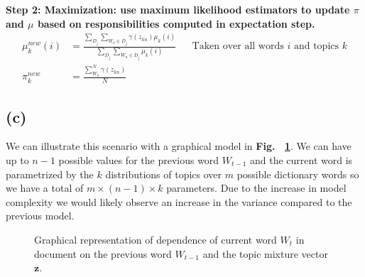 \documentclass[11pt]{amsart}
\newcommand{\vek}[1]{\mathbf{#1}}
\begin{document}
{\bf Step 2: Maximization: use maximum likelihood estimators to update $\pi$ and $\mu$ based on responsibilities computed in expectation step.}\\


\begin{equation}
\begin{aligned}
\mu_{k}^{new}(i) &= \frac{\sum_{D_j }\sum_{W_n \in D_j} \gamma(z_{kn}) \mu_{k}(i)}{\sum_{D_j} \sum_{W_n \in D_j}  \mu_{k}(i)} && \text{Taken over all words $i$ and topics $k$}\\
\pi_{k}^{new} &= \frac{\sum_{W_n}^{N} \gamma(z_{kn})}{N}
\end{aligned}
\end{equation}

\subsection{(c)}

We can illustrate this scenario with a graphical model in {\bf Fig. ~\ref{fig:graph}}. We can have up to $n-1$ possible values for the previous word $W_{t-1}$ and the current word is parametrized by the $k$ distributions of topics over $m$ possible dictionary words so we have a total of $m \times (n-1) \times k$ parameters. Due to the increase in model complexity we would likely observe an increase in the variance compared to the previous model. 

\begin{figure}
\caption{Graphical representation of dependence of current word $W_t$ in document on the previous word $W_{t-1}$ and the topic mixture vector $\vek{z}$.}
\label{fig:graph}
\end{figure}






\end{document}
